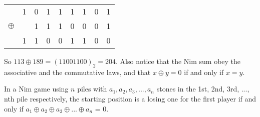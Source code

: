 		\begin{center}
			\begin{tabular}{ccccccccc} 
			&1&0&1&1&1&1&0&1\\
			$\oplus$&&1&1&1&0&0&0&1\\
			\hline
			&1&1&0&0&1&1&0&0
		\end{tabular}
		\end{center}
		So $113 \oplus 189 = (11001100)_2 = 204$. Also notice that the Nim sum obey the associative and the commutative laws, and that $x \oplus y = 0$ if and only if $x = y$.
		\begin{theorem} 
		In a Nim game using $n$ piles with $a_1, a_2, a_3, ... , a_n$ stones in the 1st, 2nd, 3rd, ..., nth pile respectively, the starting position is a losing one for the first player if and only if $a_1 \oplus a_2 \oplus a_3 \oplus...\oplus a_n$ = 0.			
		\end{theorem}
